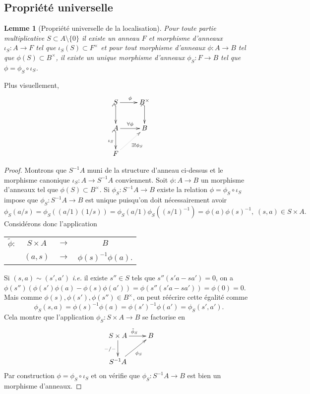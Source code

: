 \documentclass[a4paper, oneside, 12pt]{book}
\theoremstyle{theoremeStyle} %
\newtheorem{lemme}[theoreme]{Lemme}
\theoremstyle{definition} %
\newcommand{\ie}{\textit{i.e.}} %
\begin{document}
 \subsection{Propriété universelle}\label{LocUniv}
	\begin{lemme}[Propriété universelle de la localisation]
		Pour toute partie multiplicative $S\subset A\setminus\lbrace 0\rbrace$  il existe un anneau $F$ et morphisme d'anneaux $\iota_S:A\rightarrow F$ tel que $\iota_S(S)\subset F^\times$ et pour tout  morphisme d'anneaux $\phi:A\rightarrow B$ tel que $\phi(S)\subset B^\times $, il  existe un unique morphisme d'anneaux $ \phi_S:F\rightarrow B$ tel que $\phi=  \phi_S\circ \iota_S$.
	\end{lemme}


  Plus visuellement,
	$$\xymatrix{
		S\ar[r]^\phi\ar@{_{(}->}[d]&B^\times\ar@{_{(}->}[d] \\
		A\ar[r]^{\forall\phi}\ar@{_{(}->}[d]_{\iota_S}&B \\
		F\ar@{.>}[ur]_{\exists ! \phi_S}}
	$$

 \begin{proof} Montrons que  $S^{-1}A$ muni de la structure d'anneau ci-dessus et le morphisme canonique $\iota_S:A\rightarrow S^{-1}A$ conviennent. Soit $\phi:A\rightarrow B$  un morphisme d'anneaux tel que $\phi(S)\subset B^\times$.  Si $\phi_S:S^{-1}A\rightarrow B$ existe la relation $\phi=  \phi_S\circ \iota_S$ impose que  $\phi_S :S^{-1}A\rightarrow B$ est unique puisqu'on doit nécessairement avoir
 $$\phi_S(a/s)=\phi_S((a/1)(1/s))=\phi_S(a/1)\phi_S((s/1)^{-1})=\phi(a)\phi(s)^{-1},\; (s,a)\in S\times A.$$
 Considérons donc l'application  \begin{tabular}[t]{lclc}
	 $\tilde{\phi} : $&$ S\times A $&$\rightarrow$&$B$\\
 &$(a,s) $&$\rightarrow$&$ \phi(s)^{-1}\phi(a)$.
 \end{tabular}
 Si $(s,a)\sim (s',a')$  \ie{} il existe $s''\in S$ tels que $s''(s'a-sa')=0$, on a $\phi(s'')(\phi(s')\phi(a)-\phi(s)\phi(a'))=\phi(s''(s'a-sa'))=\phi(0)=0$. Mais comme $\phi(s),\phi(s'),\phi(s'')\in B^{\times}$, on peut réécrire cette égalité comme
 $$\phi_S(s,a)=\phi(s)^{-1}\phi(a)=\phi(s')^{-1}\phi(a')=\phi_S(s',a').$$
 Cela montre que l'application $\phi_S: S\times A  \rightarrow  B$ se factorise  en
 $$\xymatrix{S\times A \ar[r]^{\tilde{\phi}_S}\ar[d]_{  -/-}& B\\
 S^{-1}A \ar[ur]_{\phi_S}&} $$
Par construction $\phi=  \phi_S\circ \iota_S$ et on vérifie que $\phi_S:S^{-1}A\rightarrow B$ est bien un morphisme d'anneaux.
  \end{proof}
\end{document}

